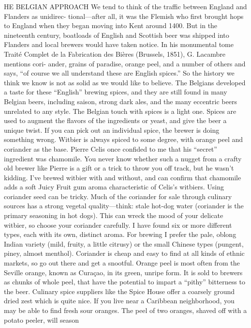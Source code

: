 \documentclass[a4paper,parskip=half]{scrartcl}
\begin{document}
\parencite[338\psqq]{Mosher2015}
HE BELGIAN APPROACH
We tend to think of the traffic between England and Flanders as unidirec-
tional—after all, it was the Flemish who first brought hops to England when
they began moving into Kent around 1400. But in the nineteenth century,
boatloads of English and Scottish beer was shipped into Flanders and local
brewers would have taken notice. In his monumental tome Traité Complet
de la Fabrication des Bières (Brussels, 1851), G. Lacambre mentions cori-
ander, grains of paradise, orange peel, and a number of others and says, “of
course we all understand these are English spices.” So the history we think
we know is not as solid as we would like to believe.
The Belgians developed a taste for these “English” brewing spices, and
they are still found in many Belgian beers, including saison, strong dark ales,
and the many eccentric beers unrelated to any style. The Belgian touch with
spices is a light one. Spices are used to augment the flavors of the ingredients
or yeast, and give the beer a unique twist. If you can pick out an individual
spice, the brewer is doing something wrong.
Witbier is always spiced to some degree, with orange peel and coriander
as the base. Pierre Celis once confided to me that his “secret” ingredient was
chamomile. You never know whether such a nugget from a crafty old brewer
like Pierre is a gift or a trick to throw you off track, but he wasn’t kidding. I’ve
brewed witbier with and without, and can confirm that chamomile adds a
soft Juicy Fruit gum aroma characteristic of Celis’s witbiers.
Using coriander seed can be tricky. Much of the coriander for sale through
culinary sources has a strong vegetal quality—think: stale hot-dog water
(coriander is the primary seasoning in hot dogs). This can wreck the mood of
your delicate witbier, so choose your coriander carefully. I have found six or
more different types, each with its own, distinct aroma. For brewing I prefer
the pale, oblong Indian variety (mild, fruity, a little citrusy) or the small Chinese
types (pungent, piney, almost menthol). Coriander is cheap and easy to ﬁnd
at all kinds of ethnic markets, so go out there and get a snootful.
Orange peel is most often from the Seville orange, known as Curaçao, in
its green, unripe form. It is sold to brewers as chunks of whole peel, that have
the potential to impart a “pithy” bitterness to the beer. Culinary spice suppliers
like the Spice House offer a coarsely ground dried zest which is quite nice.
If you live near a Caribbean neighborhood, you may be able to ﬁnd fresh sour
oranges. The peel of two oranges, shaved off with a potato peeler, will season
\end{document}
